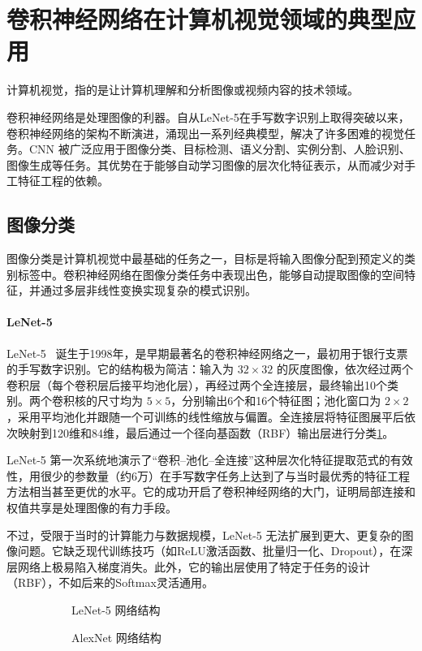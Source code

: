 \section{卷积神经网络在计算机视觉领域的典型应用}

计算机视觉，指的是让计算机理解和分析图像或视频内容的技术领域。

卷积神经网络是处理图像的利器。自从LeNet-5\cite{1998Gradient}在手写数字识别上取得突破以来，卷积神经网络的架构不断演进，涌现出一系列经典模型，解决了许多困难的视觉任务。CNN 被广泛应用于图像分类、目标检测、语义分割、实例分割、人脸识别、图像生成等任务。其优势在于能够自动学习图像的层次化特征表示，从而减少对手工特征工程的依赖。

\subsection{图像分类}

图像分类是计算机视觉中最基础的任务之一，目标是将输入图像分配到预定义的类别标签中。卷积神经网络在图像分类任务中表现出色，能够自动提取图像的空间特征，并通过多层非线性变换实现复杂的模式识别。

\paragraph{LeNet-5}

LeNet-5~\cite{1998Gradient} 诞生于1998年，是早期最著名的卷积神经网络之一，最初用于银行支票的手写数字识别。它的结构极为简洁：输入为 $32\times32$ 的灰度图像，依次经过两个卷积层（每个卷积层后接平均池化层），再经过两个全连接层，最终输出10个类别。两个卷积核的尺寸均为 $5\times5$，分别输出6个和16个特征图；池化窗口为 $2\times2$，采用平均池化并跟随一个可训练的线性缩放与偏置。全连接层将特征图展平后依次映射到120维和84维，最后通过一个径向基函数（RBF）输出层进行分类\cref{fig:lenet-5}。

LeNet-5 第一次系统地演示了“卷积–池化–全连接”这种层次化特征提取范式的有效性，用很少的参数量（约6万）在手写数字任务上达到了与当时最优秀的特征工程方法相当甚至更优的水平。它的成功开启了卷积神经网络的大门，证明局部连接和权值共享是处理图像的有力手段。

不过，受限于当时的计算能力与数据规模，LeNet-5 无法扩展到更大、更复杂的图像问题。它缺乏现代训练技巧（如ReLU激活函数、批量归一化、Dropout），在深层网络上极易陷入梯度消失。此外，它的输出层使用了特定于任务的设计（RBF），不如后来的Softmax灵活通用。

\begin{figure}
    \centering
    \begin{subfigure}{0.3\textwidth}
        \centering
        
        \caption{LeNet-5 网络结构}
        \label{fig:lenet-5}
    \end{subfigure}
    \begin{subfigure}{0.3\textwidth}
        \centering
        
        \caption{AlexNet 网络结构}
        \label{fig:alexnet}
    \end{subfigure}
    \caption{}
\end{figure}

